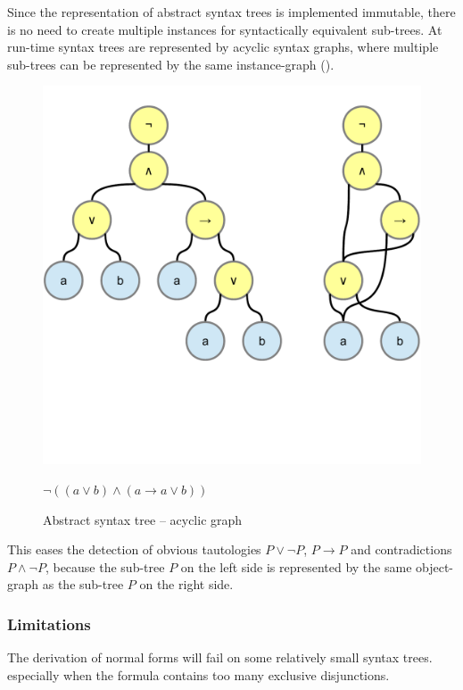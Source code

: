 Since the representation of abstract syntax trees is implemented immutable,
there is no need to create multiple instances for syntactically equivalent sub-trees. 
At run-time syntax trees are represented by acyclic syntax graphs, 
where multiple sub-trees can be represented by the same instance-graph
().

\begin{figure}[htb]
\begin{center}
\includegraphics[scale=0.5,trim=0cm 5.4cm 0cm 1cm,clip=true]{diagrams/AcyclicSyntaxGraph.pdf}
\caption{Abstract syntax tree – acyclic graph }{$\neg( (a\vee b) \wedge (a \rightarrow a\vee b))$}
\label{fig:AST+ASG}
\end{center}
\end{figure}

This eases the detection of obvious tautologies $P \vee \neg P$, $P \rightarrow P$ and contradictions $P \wedge \neg P$,
because the sub-tree $P$ on the left side is represented by the same object-graph as the sub-tree $P$ on the right side.

\subsubsection{Limitations}

The derivation of normal forms will fail on some relatively small syntax trees.
especially when the formula contains too many exclusive disjunctions.

